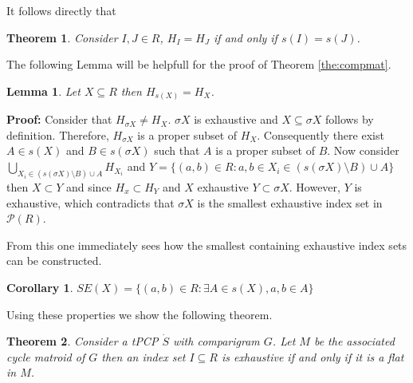 \documentclass[a4paper,12pt]{article}
\newtheorem{theorem}{Theorem}
\newtheorem{corollary}{Corollary}
\newtheorem{lemma}{Lemma}
\newenvironment{proof}[1][Proof]{\noindent\textbf{#1:} }{}
\begin{document}
It follows directly that 

\begin{theorem}
  Consider $I, J \in R$, $H_I = H_J$ if and only if $s(I) = s(J)$. 
\end{theorem}

The following Lemma will be helpfull for the proof of Theorem
\ref{the:compmat}. 

\begin{lemma}
  Let $X \subseteq R$ then $H_{s(X)} = H_X$. 
\end{lemma}

\begin{proof}
  Consider that $H_{\sigma X} \neq H_X$. $\sigma X$ is exhaustive and
  $X \subseteq \sigma X$ follows by definition. Therefore, $H_{\sigma
    X}$ is a proper subset of $H_X$. Consequently there exist $A \in
  s(X)$ and $B \in s(\sigma X)$ such that $A$ is a proper subset of
  $B$. Now consider $\bigcup_{X_i \in (s(\sigma X)\setminus B)\cup A}
  H_{X_i}$ and $Y = \{(a,b) \in R: a,b \in X_i \in (s(\sigma
  X)\setminus B)\cup A\}$ then $X \subset Y$ and since $H_x \subset
  H_Y$ and $X$ exhaustive $Y \subset \sigma X$. However, $Y$ is
  exhaustive, which contradicts that $\sigma X$ is the smallest
  exhaustive index set in $\mathcal{P}(R)$.
\end{proof}

From this one immediately sees how the smallest containing exhaustive
index sets can be constructed.

\begin{corollary}
  $SE(X) = \{(a,b) \in R:\exists A \in s(X), a,b \in A\}$
\end{corollary}


Using these properties we show the following theorem. 

\begin{theorem}
  Consider a tPCP $\dot{S}$ with comparigram $G$. Let $M$ be the
  associated cycle matroid of $G$ then an index set $I \subseteq R$ is
  exhaustive if and only if it is a flat in $M$.
\end{theorem}
\end{document}
